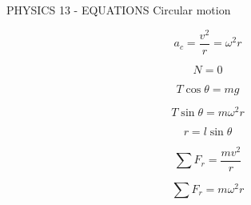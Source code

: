 PHYSICS 13 - EQUATIONS
Circular motion

$$a_c = \frac{v^2}{r} = \omega^2 r$$

$$N = 0$$

$$T\cos\theta = mg$$

$$T\sin\theta = m\omega^2 r$$

$$r = l\sin\theta$$


$$\sum F_r=\frac{mv^2}{r}$$

$$\sum F_r=m\omega^2r$$
